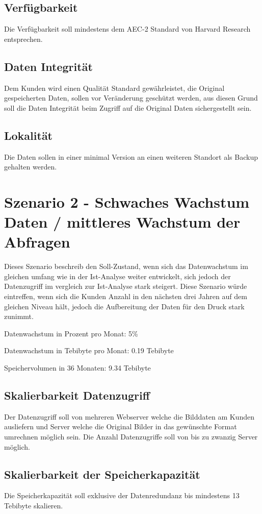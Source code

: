 \subsection{Verfügbarkeit}
Die Verfügbarkeit soll mindestens dem AEC-2 Standard von Harvard Research entsprechen.

\subsection{Daten Integrität}
Dem Kunden wird einen Qualität Standard gewährleistet, die Original gespeicherten Daten, sollen vor Veränderung geschützt werden, aus diesen Grund soll die Daten Integrität beim Zugriff auf die Original Daten sichergestellt sein.

\subsection{Lokalität}
Die Daten sollen in einer minimal Version an einen weiteren Standort als Backup gehalten werden.



\section{Szenario 2 - Schwaches Wachstum Daten / mittleres Wachstum der Abfragen}
Dieses Szenario beschreib den Soll-Zustand, wenn sich das Datenwachstum im gleichen umfang wie in der Ist-Analyse weiter entwickelt, sich jedoch der Datenzugriff im vergleich zur Ist-Analyse stark steigert. Diese Szenario würde eintreffen, wenn sich die Kunden Anzahl in den nächsten drei Jahren auf dem gleichen Niveau hält, jedoch die Aufbereitung der Daten für den Druck stark zunimmt.

Datenwachstum in Prozent pro Monat: 5\% 

Datenwachstum in Tebibyte pro Monat: 0.19 Tebibyte

Speichervolumen in 36 Monaten: 9.34 Tebibyte

\subsection{Skalierbarkeit Datenzugriff}
Der Datenzugriff soll von mehreren Webserver welche die Bilddaten am Kunden ausliefern und Server welche die Original Bilder in das gewünschte Format umrechnen möglich sein. Die Anzahl Datenzugriffe soll von bis zu zwanzig Server möglich.

\subsection{Skalierbarkeit der Speicherkapazität}
Die Speicherkapazität soll exklusive der Datenredundanz bis mindestens 13 Tebibyte skalieren.

